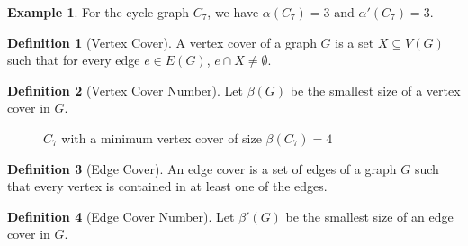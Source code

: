 \documentclass{article}
\theoremstyle{definition}
\newtheorem{example}{Example}
\newtheorem{definition}{Definition}
\begin{document}
\begin{example}
For the cycle graph $C_7$, we have $\alpha(C_7) = 3$ and $\alpha'(C_7) = 3$.
\end{example}

\begin{definition}[Vertex Cover]
A vertex cover of a graph $G$ is a set $X \subseteq V(G)$ such that for every edge $e \in E(G)$, $e \cap X \neq \emptyset$.
\end{definition}

\begin{definition}[Vertex Cover Number]
Let $\beta(G)$ be the smallest size of a vertex cover in $G$.
\end{definition}

\begin{figure}[h]
\centering
{}
\caption{$C_7$ with a minimum vertex cover of size $\beta(C_7) = 4$}
\label{fig:c7-vertex-cover}
\end{figure}

\begin{definition}[Edge Cover]
An edge cover is a set of edges of a graph $G$ such that every vertex is contained in at least one of the edges.
\end{definition}

\begin{definition}[Edge Cover Number]
Let $\beta'(G)$ be the smallest size of an edge cover in $G$.
\end{definition}
\end{document}
